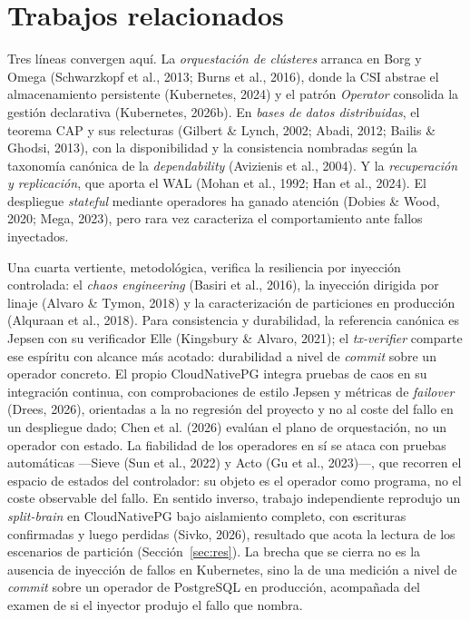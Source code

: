 \documentclass[12pt,twocolumn,letterpaper]{article}
\begin{document}
\section{Trabajos relacionados}\label{sec:rel}
Tres líneas convergen aquí. La \emph{orquestación de clústeres} arranca en Borg y Omega (Schwarzkopf et al., 2013; Burns et al., 2016), donde la CSI abstrae el almacenamiento persistente (Kubernetes, 2024) y el patrón \textit{Operator} consolida la gestión declarativa (Kubernetes, 2026b). En \emph{bases de datos distribuidas}, el teorema CAP y sus relecturas (Gilbert \& Lynch, 2002; Abadi, 2012; Bailis \& Ghodsi, 2013), con la disponibilidad y la consistencia nombradas según la taxonomía canónica de la \textit{dependability} (Avizienis et al., 2004). Y la \emph{recuperación y replicación}, que aporta el WAL (Mohan et al., 1992; Han et al., 2024). El despliegue \textit{stateful} mediante operadores ha ganado atención (Dobies \& Wood, 2020; Mega, 2023), pero rara vez caracteriza el comportamiento ante fallos inyectados.

Una cuarta vertiente, metodológica, verifica la resiliencia por inyección controlada: el \textit{chaos engineering} (Basiri et al., 2016), la inyección dirigida por linaje (Alvaro \& Tymon, 2018) y la caracterización de particiones en producción (Alquraan et al., 2018). Para consistencia y durabilidad, la referencia canónica es Jepsen con su verificador Elle (Kingsbury \& Alvaro, 2021); el \textit{tx-verifier} comparte ese espíritu con alcance más acotado: durabilidad a nivel de \textit{commit} sobre un operador concreto. El propio CloudNativePG integra pruebas de caos en su integración continua, con comprobaciones de estilo Jepsen y métricas de \textit{failover} (Drees, 2026), orientadas a la no regresión del proyecto y no al coste del fallo en un despliegue dado; Chen et al. (2026) evalúan el plano de orquestación, no un operador con estado. La fiabilidad de los operadores en sí se ataca con pruebas automáticas —Sieve (Sun et al., 2022) y Acto (Gu et al., 2023)—, que recorren el espacio de estados del controlador: su objeto es el operador como programa, no el coste observable del fallo. En sentido inverso, trabajo independiente reprodujo un \textit{split-brain} en CloudNativePG bajo aislamiento completo, con escrituras confirmadas y luego perdidas (Sivko, 2026), resultado que acota la lectura de los escenarios de partición (Sección~\ref{sec:res}). La brecha que se cierra no es la ausencia de inyección de fallos en Kubernetes, sino la de una medición a nivel de \textit{commit} sobre un operador de PostgreSQL en producción, acompañada del examen de si el inyector produjo el fallo que nombra.
\end{document}

